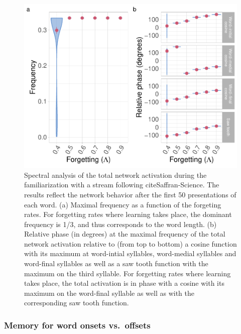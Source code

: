 \documentclass[
]{article}
\begin{document}
\begin{figure}
\includegraphics[width=1\linewidth]{tp_model_entrainment_files/figure-latex/basic-experiment-global-print-freq-phase-plot-1} \caption{Spectral analysis of the total network activation during the familiarization with a stream following cite{Saffran-Science}. The results reflect the network behavior after the first 50 presentations of each word. (a) Maximal frequency as a function of the forgeting rates. For forgetting rates where learning takes place, the dominant frequency is 1/3, and thus corresponds to the word length. (b) Relative phase (in degrees) at the maximal frequency of the total network activation relative to (from top to bottom) a cosine function with its maximum at word-intial syllables, word-medial syllables and word-final syllables as well as a saw tooth function with the maximum on the third syllable. For forgetting rates where learning takes place, the total activation is in phase with a cosine with its maximum on the word-final syllable as well as with the corresponding saw tooth function.}\label{fig:basic-experiment-global-print-freq-phase-plot}
\end{figure}

\hypertarget{memory-for-word-onsets-vs.-offsets-flo2022}{%
\subsubsection{\texorpdfstring{Memory for word onsets vs.~offsets
\citep{Flo2022}}{Memory for word onsets vs.~offsets {[}@Flo2022{]}}}\label{memory-for-word-onsets-vs.-offsets-flo2022}}
\end{document}
